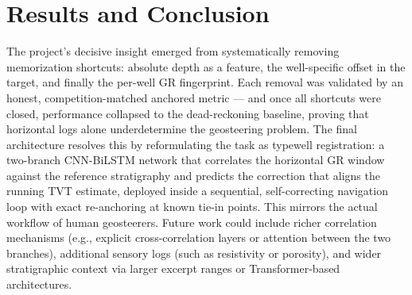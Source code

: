 \documentclass[12pt, a4paper]{article}
\begin{document}
    \section{Results and Conclusion}
    The project's decisive insight emerged from systematically removing memorization shortcuts: absolute depth as a feature, the well-specific offset in the target, and finally the per-well GR fingerprint. Each removal was validated by an honest, competition-matched anchored metric --- and once all shortcuts were closed, performance collapsed to the dead-reckoning baseline, proving that horizontal logs alone underdetermine the geosteering problem. The final architecture resolves this by reformulating the task as typewell registration: a two-branch CNN-BiLSTM network that correlates the horizontal GR window against the reference stratigraphy and predicts the correction that aligns the running TVT estimate, deployed inside a sequential, self-correcting navigation loop with exact re-anchoring at known tie-in points. This mirrors the actual workflow of human geosteerers. Future work could include richer correlation mechanisms (e.g., explicit cross-correlation layers or attention between the two branches), additional sensory logs (such as resistivity or porosity), and wider stratigraphic context via larger excerpt ranges or Transformer-based architectures.
\end{document}
